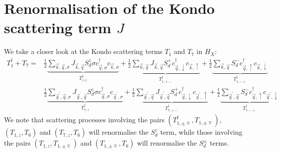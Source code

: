 \documentclass{revtex4-2}
\begin{document}
\section{Renormalisation of the Kondo scattering term \(J\)}
We take a closer look at the Kondo scattering terms \(T_1\) and \(T_7\) in \(H_X\):
\begin{equation}\begin{aligned}
	T_1^\dagger + T_7 =& \frac{1}{2}\underbrace{\sum_{\vec k,\vec q,\sigma}J_{\vec k,\vec q}S_d^z \sigma c^\dagger_{\vec q,\sigma} c_{\vec k,\sigma}}_{T_{1,z}^\dagger} + \frac{1}{2}\underbrace{\sum_{\vec k,\vec q}J_{\vec k,\vec q} S_d^+ c^\dagger_{\vec q,\downarrow} c_{\vec k,\uparrow}}_{T_{1,+-}^\dagger} + \frac{1}{2}\underbrace{\sum_{\vec k,\vec q}S_d^- c^\dagger_{\vec q,\uparrow} c_{\vec k,\downarrow}}_{T_{1,-+}^\dagger} \\
			   &\frac{1}{2}\underbrace{\sum_{\vec q^\prime,\vec q,\sigma}J_{\vec q^\prime,\vec q}S_d^z \sigma c^\dagger_{\vec q,\sigma} c_{\vec q^\prime,\sigma}}_{T_{7,z}^\dagger} + \frac{1}{2}\underbrace{\sum_{\vec q^\prime,\vec q}J_{\vec q^\prime,\vec q} S_d^+ c^\dagger_{\vec q,\downarrow} c_{\vec q^\prime,\uparrow}}_{T_{7,+-}^\dagger} + \frac{1}{2}\underbrace{\sum_{\vec q^\prime,\vec q}S_d^- c^\dagger_{\vec q,\uparrow} c_{\vec q^\prime,\downarrow}}_{T_{7,-+}^\dagger}
\end{aligned}\end{equation}
We note that scattering processes involving the pairs \(\left(T_{1,\pm \mp}^\dagger, T_{1,\pm \mp}\right)\), \(\left(T_{1,z}, T_6\right)\) and \(\left(T_{7,z}, T_6\right) \) will renormalise the \(S_d^z\) term, while those involving the pairs \(\left(T_{1,z}, T_{1,\pm \mp}\right)\) and \(\left(T_{1,\pm \mp}, T_6\right)\) will renormalise the \(S_d^\pm\) terms. 
\end{document}

